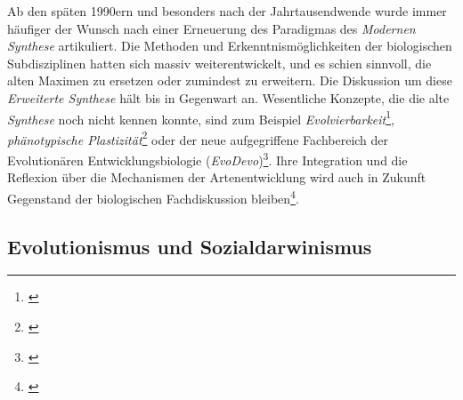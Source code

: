 \documentclass[openany,twoside,twocolumn]{book}
\let\rmarkdownfootnote\footnote%
\def\footnote{\protect\rmarkdownfootnote}
\begin{document}
Ab den späten 1990ern und besonders nach der Jahrtausendwende wurde
immer häufiger der Wunsch nach einer Erneuerung des Paradigmas des
\emph{Modernen Synthese} artikuliert. Die Methoden und
Erkenntnismöglichkeiten der biologischen Subdisziplinen hatten sich
massiv weiterentwickelt, und es schien sinnvoll, die alten Maximen zu
ersetzen oder zumindest zu erweitern. Die Diskussion um diese
\emph{Erweiterte Synthese} hält bis in Gegenwart an. Wesentliche
Konzepte, die die alte \emph{Synthese} noch nicht kennen konnte, sind
zum Beispiel \emph{Evolvierbarkeit}\footnote{\textcite{wagner_robustness_2013}},
\emph{phänotypische Plastizität}\footnote{\textcite{pigliucci_phenotypic_2001}}
oder der neue aufgegriffene Fachbereich der Evolutionären
Entwicklungsbiologie (\emph{EvoDevo})\footnote{\textcite{muller_evodevo_2007}}.
Ihre Integration und die Reflexion über die Mechanismen der
Artenentwicklung wird auch in Zukunft Gegenstand der biologischen
Fachdiskussion bleiben\footnote{\textcite{pigliucci_elements_2010}}.

\hypertarget{evolutionismus-und-sozialdarwinismus}{%
\subsection{Evolutionismus und
Sozialdarwinismus}\label{evolutionismus-und-sozialdarwinismus}}
\end{document}
